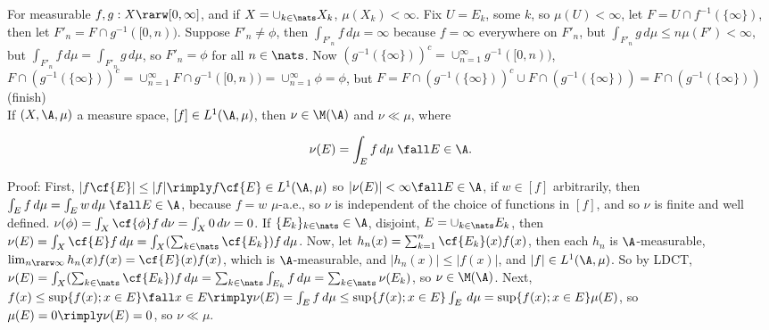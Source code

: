 \noindent
For measurable $f,g:X \rarw [0, \infty]$, and if $X = \cup_{k \in \nats} X_k$, $\mu(X_k) < \infty$. Fix $U = E_k$, some $k$, so $\mu(U) < \infty$, let $F = U \cap f^{-1}(\{\infty\})$, then let $F'_n = F \cap g^{-1}([0,n))$. Suppose $F'_n \not = \phi$, then $\int_{F'_n} f \, d\mu = \infty$ because $f = \infty$ everywhere on $F'_n$, but $\int_{F'_n} g \, d\mu \le n \mu(F') < \infty$, but $\int_{F'_n} f \, d\mu = \int_{F'_n} g \, d\mu$, so $F'_n= \phi$ for all $n \in \nats$. Now $(g^{-1}(\{\infty\}))^c = \cup_{n=1}^\infty g^{-1}([0, n))$, $F \cap (g^{-1}(\{\infty\}))^c = \cup_{n=1}^\infty F \cap g^{-1}([0, n)) = \cup_{n=1}^\infty \phi = \phi$, but 
$F = F \cap (g^{-1}(\{\infty\}))^c \cup F \cap (g^{-1}(\{\infty\})) = F \cap (g^{-1}(\{\infty\}))$ (finish) \\




If $(X, \A, \mu)$ a measure space, $[f] \in L^1(\A,\mu)$, then $\nu \in \M(\A)$ and $\nu \ll \mu$, where

$$ \nu(E) = \int_E f \, d\mu \; \fall E \in \A.$$

\noindent
Proof: First, $|f \cf{E}| \le |f| \rimply f \cf{E} \in  L^1(\A,\mu)$ so $|\nu(E)| < \infty \fall E \in \A$, if $w \in [f]$ arbitrarily, then $\int_E f \, d\mu = \int_E w \, d\mu  \; \fall E \in \A $, because $f = w$ $\mu$-a.e., so $\nu$ is independent of the choice of functions in $[f]$, and so $\nu$ is finite and well defined. $\nu(\phi) = \int_X \cf{\phi} f \, d\nu = \int_X 0 \, d\nu = 0$. If $\{ E_k \}_{k \in \nats} \in \A$, disjoint, $E  = \cup_{k \in \nats} E_k$, then $\nu(E) = \int_X \cf{E} f \, d\mu = \int_X ( \sum_{k \in \nats} \cf{E_k} ) f \, d\mu$. Now, let $h_n(x) = \sum_{k=1}^n \cf{E_k}(x) f(x)$, then each $h_n$ is $\A$-measurable, $\lim_{n \rarw \infty} h_n(x) f(x) = \cf{E}(x) f(x)$, which is $\A$-measurable, and $|h_n(x)| \le |f(x)|$, and $|f| \in L^1(\A, \mu)$. So by LDCT, $\nu(E) = \int_X ( \sum_{k \in \nats} \cf{E_k} ) f \, d\mu  =  \sum_{k \in \nats} \int_{E_k}  f \, d\mu = \sum_{k \in \nats} \nu(E_k)$, so $\nu \in \M(\A)$. Next, $f(x) \le \sup \{ f(x); x \in E \} \fall x \in E \rimply \nu(E) = \int_E f \, d\mu \le \sup \{ f(x); x \in E \} \int_E \, d\mu = \sup \{ f(x); x \in E \} \mu(E)$, so $\mu(E) = 0 \rimply \nu(E) = 0$, so $\nu \ll \mu$.







